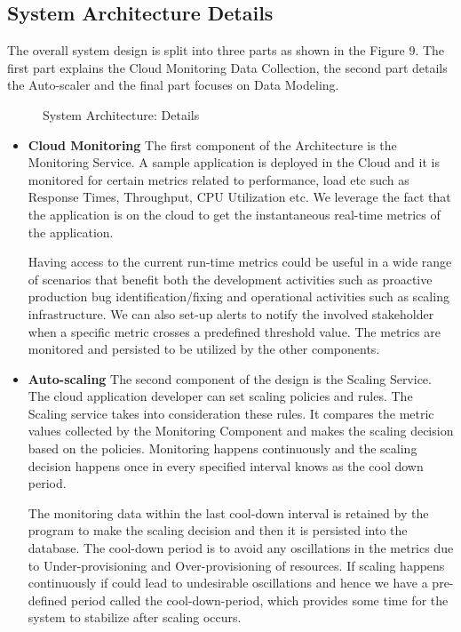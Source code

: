 \documentclass[article,type=msc,colorback,12pt,accentcolor=tud7b]{tudthesis}
\begin{document}
 \subsection{System Architecture Details}
 	The overall system design is split into three parts as shown in the Figure 9. The first part explains the Cloud Monitoring Data Collection, the second part details the Auto-scaler and the final part focuses on Data Modeling. 			
 	
 			 \begin{figure}
 			 	\begin{center}
 			 		\makebox[\textwidth]{\texttt{[image: C2]}}
 			 	\end{center}
 			 	\caption{System Architecture: Details}
 			 \end{figure}
 	
 	 \begin{itemize}
 	 	\item{\textbf{Cloud Monitoring}} 
 	 	\newline   The first component of the Architecture is the Monitoring Service. A sample application is deployed in the Cloud and it is monitored for certain metrics related to performance, load etc such as Response Times, Throughput, CPU Utilization etc. We leverage the fact that the application is on the cloud to get the instantaneous real-time metrics of the application. 
 	 	\par Having access to the current run-time metrics could be useful in a wide range of scenarios that benefit both the development activities such as proactive production bug identification/fixing and operational activities such as scaling infrastructure. We can also set-up alerts to notify the involved stakeholder when a specific metric crosses a predefined threshold value. The metrics are monitored and persisted to be utilized by the other components. 
 	 	
 	 	\item {\textbf{Auto-scaling}} 
 	 	\newline The second component of the design is the Scaling Service. The cloud application developer can set scaling policies and rules. The Scaling service takes into consideration these rules. It compares the metric values collected by the Monitoring Component and makes the scaling decision based on the policies. Monitoring happens continuously and the scaling decision happens once in every specified interval knows as the cool down period. 
 	 	\par The monitoring data within the last cool-down interval is retained by the program to make the scaling decision and then it is persisted into the database. The cool-down period is to avoid any oscillations in the metrics due to Under-provisioning and Over-provisioning of resources. If scaling happens continuously if could lead to undesirable oscillations and hence we have a pre-defined period called the cool-down-period, which provides some time for the system to stabilize after scaling occurs. 
 	 	

\end{itemize}
\end{document}
